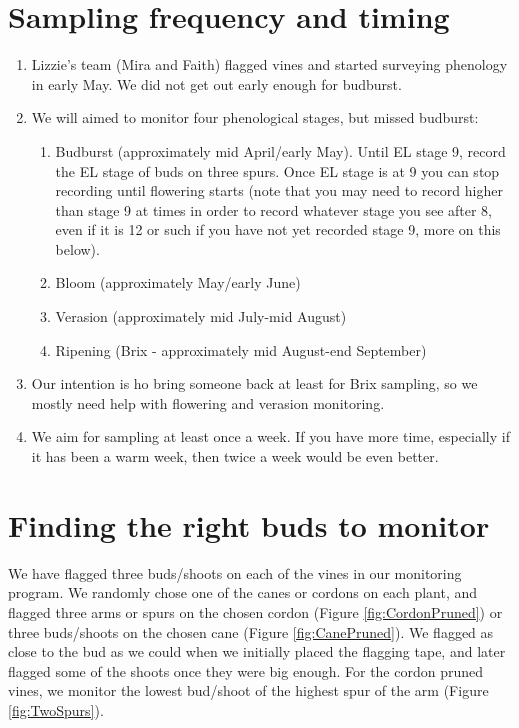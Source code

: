 \documentclass[11pt,letter]{article}
\begin{document}
\section{Sampling frequency and timing}
\begin{enumerate}
  \item Lizzie's team (Mira and Faith) flagged vines and started surveying phenology in early May. We did not get out early enough for budburst. 
  \item We will aimed to monitor four phenological stages, but missed budburst:
  \begin{enumerate}
	\item Budburst (approximately mid April/early May). Until EL stage 9, record the EL stage of buds on three spurs. Once EL stage is at 9 you can stop recording until flowering starts (note that you may need to record higher than stage 9 at times in order to record whatever stage you see after 8, even if it is 12 or such if you have not yet recorded stage 9, more on this below).
	\item Bloom (approximately May/early June)
  	\item Verasion (approximately mid July-mid August)
  	\item Ripening (Brix - approximately mid August-end September)
  \end{enumerate}
  \item Our intention is ho bring someone back at least for Brix sampling, so we mostly need help with flowering and verasion monitoring. 
  \item We aim for sampling at least once a week. If you have more time, especially if it has been a warm week, then twice a week would be even better.

\end{enumerate}

\section{Finding the right buds to monitor}
We have flagged three buds/shoots on each of the vines in our monitoring program. We randomly chose one of the canes or cordons on each plant, and flagged three arms or spurs on the chosen cordon (Figure \ref{fig:CordonPruned}) or three buds/shoots on the chosen cane (Figure \ref{fig:CanePruned}). We flagged as close to the bud as we could when we initially placed the flagging tape, and later flagged some of the shoots once they were big enough. For the cordon pruned vines, we monitor the lowest bud/shoot of the highest spur of the arm (Figure \ref{fig:TwoSpurs}). 
\end{document}
